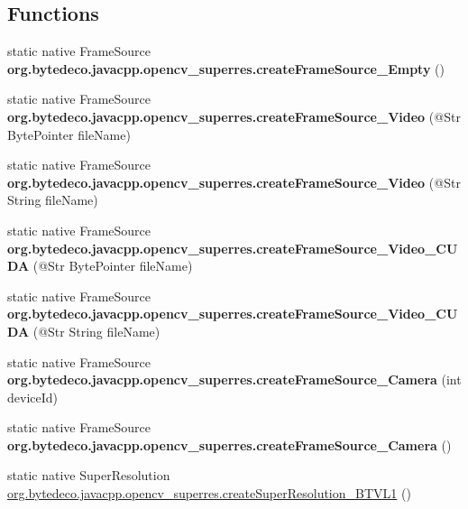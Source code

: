 \subsection*{Functions}
\begin{DoxyCompactItemize}
\item 
\mbox{\label{group__superres_ga6631717c477d2fe31574208aa9ee4711}} 
static native Frame\+Source {\bfseries org.\+bytedeco.\+javacpp.\+opencv\+\_\+superres.\+create\+Frame\+Source\+\_\+\+Empty} ()
\item 
\mbox{\label{group__superres_gae8a12c0949182f076dfce4ef5f50017a}} 
static native Frame\+Source {\bfseries org.\+bytedeco.\+javacpp.\+opencv\+\_\+superres.\+create\+Frame\+Source\+\_\+\+Video} (@Str Byte\+Pointer file\+Name)
\item 
\mbox{\label{group__superres_gaff3460034b4becf50b180341f7a9ec41}} 
static native Frame\+Source {\bfseries org.\+bytedeco.\+javacpp.\+opencv\+\_\+superres.\+create\+Frame\+Source\+\_\+\+Video} (@Str String file\+Name)
\item 
\mbox{\label{group__superres_gaec35050588ae4917fb1bbc445fef30ff}} 
static native Frame\+Source {\bfseries org.\+bytedeco.\+javacpp.\+opencv\+\_\+superres.\+create\+Frame\+Source\+\_\+\+Video\+\_\+\+C\+U\+DA} (@Str Byte\+Pointer file\+Name)
\item 
\mbox{\label{group__superres_gaa24819ab29f9365c4d4483abf86516ff}} 
static native Frame\+Source {\bfseries org.\+bytedeco.\+javacpp.\+opencv\+\_\+superres.\+create\+Frame\+Source\+\_\+\+Video\+\_\+\+C\+U\+DA} (@Str String file\+Name)
\item 
\mbox{\label{group__superres_gaf3ceb8cbcff86dc7a939260646aaa01b}} 
static native Frame\+Source {\bfseries org.\+bytedeco.\+javacpp.\+opencv\+\_\+superres.\+create\+Frame\+Source\+\_\+\+Camera} (int device\+Id)
\item 
\mbox{\label{group__superres_ga7580dbe75b3c77cce4ca1f0119959fef}} 
static native Frame\+Source {\bfseries org.\+bytedeco.\+javacpp.\+opencv\+\_\+superres.\+create\+Frame\+Source\+\_\+\+Camera} ()
\item 
static native Super\+Resolution \hyperlink{group__superres_gac2dfc5e8422832bbb249c6675e7cb851}{org.\+bytedeco.\+javacpp.\+opencv\+\_\+superres.\+create\+Super\+Resolution\+\_\+\+B\+T\+V\+L1} ()

\end{DoxyCompactItemize}
